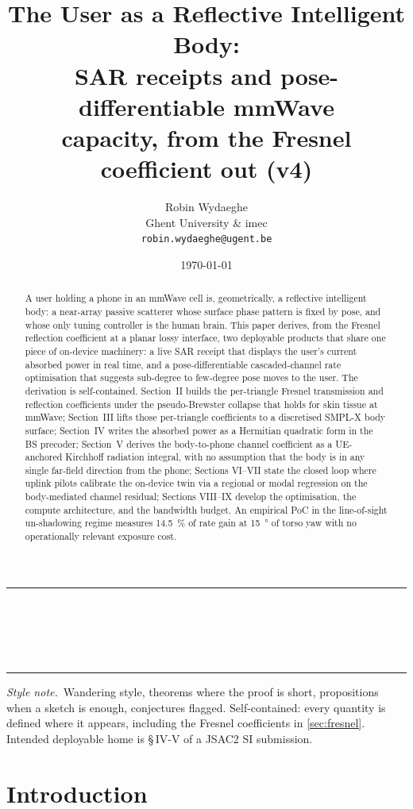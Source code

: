 \documentclass[11pt,a4paper]{article}
\title{\textbf{The User as a Reflective Intelligent Body:\\
SAR receipts and pose-differentiable mmWave\\
capacity, from the Fresnel coefficient out (v4)}}
\author{Robin Wydaeghe\\
 Ghent University \& imec\\
 \texttt{robin.wydaeghe@ugent.be}}
\date{\today}
\makeatletter
\theoremstyle{definition}
\renewcommand{\maketitle}{%
  \thispagestyle{plain}%
  \begin{center}
    \rule{\linewidth}{1pt}\\[0.4em]
    {\LARGE\bfseries \@title}\\[0.5em]
    {\large \@author}\\[0.3em]
    {\small \@date}\\[0.4em]\rule{\linewidth}{1pt}
  \end{center}
  \vspace{0.5em}
}
\makeatother
\begin{document}
\maketitle

\begin{abstract}
A user holding a phone in an mmWave cell is, geometrically, a
reflective intelligent body: a near-array passive scatterer whose
surface phase pattern is fixed by pose, and whose only tuning
controller is the human brain.  This paper derives, from the
Fresnel reflection coefficient at a planar lossy interface, two
deployable products that share one piece of on-device machinery: a
live SAR receipt that displays the user's current absorbed power
in real time, and a pose-differentiable cascaded-channel rate
optimisation that suggests sub-degree to few-degree pose moves to
the user.  The derivation is self-contained.  Section~II builds
the per-triangle Fresnel transmission and reflection coefficients
under the pseudo-Brewster collapse that holds for skin tissue at
mmWave; Section~III lifts those per-triangle coefficients to a
discretised SMPL-X body surface; Section~IV writes the absorbed
power as a Hermitian quadratic form in the BS precoder; Section~V
derives the body-to-phone channel coefficient as a UE-anchored
Kirchhoff radiation integral, with no assumption that the body is
in any single far-field direction from the phone; Sections VI--VII
state the closed loop where uplink pilots calibrate the on-device
twin via a regional or modal regression on the body-mediated
channel residual; Sections VIII--IX develop the optimisation, the
compute architecture, and the bandwidth budget.  An empirical PoC
in the line-of-sight un-shadowing regime measures
\SI{14.5}{\percent} of rate gain at \SI{15}{\degree} of torso
yaw with no operationally relevant exposure cost.
\end{abstract}

\vspace{0.3em}
\noindent\textit{Style note.}~Wandering style, theorems where the
proof is short, propositions when a sketch is enough, conjectures
flagged.  Self-contained: every quantity is defined where it
appears, including the Fresnel coefficients in
\cref{sec:fresnel}.  Intended deployable home is \S\,IV-V of a
JSAC2 SI submission.

\tableofcontents
\bigskip

\section{Introduction}\label{sec:intro}
\end{document}
